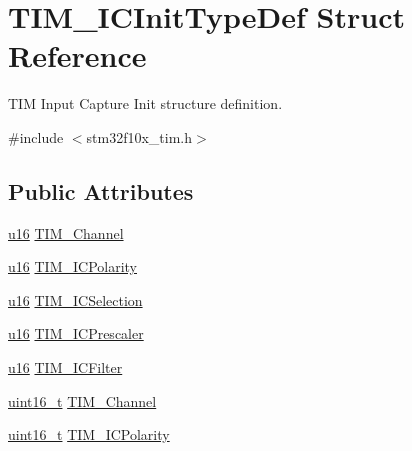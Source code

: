 \hypertarget{struct_t_i_m___i_c_init_type_def}{}\section{T\+I\+M\+\_\+\+I\+C\+Init\+Type\+Def Struct Reference}
\label{struct_t_i_m___i_c_init_type_def}


T\+IM Input Capture Init structure definition.  




{\ttfamily \#include $<$stm32f10x\+\_\+tim.\+h$>$}

\subsection*{Public Attributes}
\begin{DoxyCompactItemize}
\item 
\hyperlink{agilefox_2library_2inc_2stm32f10x__type_8h_a9e6c91d77e24643b888dbd1a1a590054}{u16} \hyperlink{struct_t_i_m___i_c_init_type_def_a251495d3310ddd8b0ded95f6b8746592}{T\+I\+M\+\_\+\+Channel}
\item 
\hyperlink{agilefox_2library_2inc_2stm32f10x__type_8h_a9e6c91d77e24643b888dbd1a1a590054}{u16} \hyperlink{struct_t_i_m___i_c_init_type_def_acb97723cac0cc6f15d574afacda018c1}{T\+I\+M\+\_\+\+I\+C\+Polarity}
\item 
\hyperlink{agilefox_2library_2inc_2stm32f10x__type_8h_a9e6c91d77e24643b888dbd1a1a590054}{u16} \hyperlink{struct_t_i_m___i_c_init_type_def_a70ccc8b1a7d9f0f8edba13fb658bb6a0}{T\+I\+M\+\_\+\+I\+C\+Selection}
\item 
\hyperlink{agilefox_2library_2inc_2stm32f10x__type_8h_a9e6c91d77e24643b888dbd1a1a590054}{u16} \hyperlink{struct_t_i_m___i_c_init_type_def_a77aaa302d1e8d890dbd46388ae393bac}{T\+I\+M\+\_\+\+I\+C\+Prescaler}
\item 
\hyperlink{agilefox_2library_2inc_2stm32f10x__type_8h_a9e6c91d77e24643b888dbd1a1a590054}{u16} \hyperlink{struct_t_i_m___i_c_init_type_def_a6816e1c2479bd97b0d2d2f603973d917}{T\+I\+M\+\_\+\+I\+C\+Filter}
\item 
\hyperlink{_p_e___types_8h_a1f1825b69244eb3ad2c7165ddc99c956}{uint16\+\_\+t} \hyperlink{struct_t_i_m___i_c_init_type_def_ab9404ee3d95aaa7a478ed99562c736d2}{T\+I\+M\+\_\+\+Channel}
\item 
\hyperlink{_p_e___types_8h_a1f1825b69244eb3ad2c7165ddc99c956}{uint16\+\_\+t} \hyperlink{struct_t_i_m___i_c_init_type_def_a234c284efc36c0cc15a2ed0fb4435557}{T\+I\+M\+\_\+\+I\+C\+Polarity}

\end{DoxyCompactItemize}
